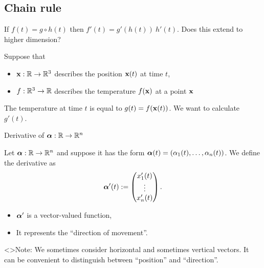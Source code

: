 
% 

\subsection*{Chain rule}

If \(f(t) = g\circ h(t)\) then \(f'(t) = g'(h(t)) \ h'(t)\).
Does this extend to higher dimension?

\begin{example*}
    Suppose that
    \begin{itemize}
        \item \(\mathbf{x}:\mathbb{R} \to \mathbb{R}^3\) describes the position \(\mathbf{x}(t)\) at time \(t\),
        \item \(f:\mathbb{R}^3 \to \mathbb{R}\) describes the temperature \(f(\mathbf{x})\) at a point \(\mathbf{x}\)
    \end{itemize}

    The temperature at time \(t\) is equal to \(g(t)=f(\mathbf{x}(t))\).
    We want to calculate \(g'(t)\).
\end{example*}






{Derivative of \(\boldsymbol{\alpha}:\mathbb{R} \to \mathbb{R}^n\)}


Let \(\boldsymbol{\alpha}:\mathbb{R} \to \mathbb{R}^n\) and suppose it has the form
\(\boldsymbol{\alpha}(t) = \left( \alpha_1(t), \ldots, \alpha_n(t)  \right)\).
We define the derivative as
\[
    \aalpha'(t) := \begin{pmatrix}
        x_1'(t) \\
        \vdots  \\
        x_n'(t)
    \end{pmatrix}.  %
\]




\begin{itemize}
    \item \(\boldsymbol{\alpha}'\) is a vector-valued function,
    \item It represents the ``direction of movement''.
\end{itemize}

<>{Note:}
We sometimes consider horizontal and sometimes vertical vectors. It can be convenient to distinguish between ``position'' and ``direction''.


